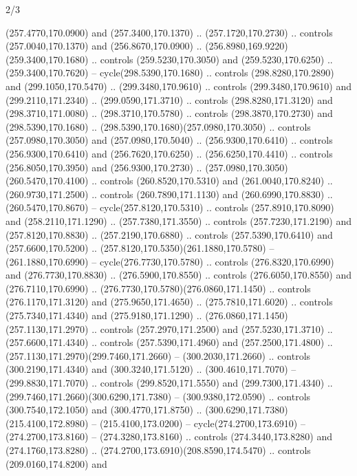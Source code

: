 \begin{flagdescription}{2/3}
\begin{scope}[xshift=0.5\flaglength,yshift=0.5\flagwidth,scale=\flagwidth/259.2]
\begin{scope}[y=0.8pt, x=0.8pt, yscale=-1,shift={(-243,-162)}]
      (257.4770,170.0900) and (257.3400,170.1370) .. (257.1720,170.2730) .. controls
      (257.0040,170.1370) and (256.8670,170.0900) ..
      (256.8980,169.9220)(259.3400,170.1680) .. controls (259.5230,170.3050) and
      (259.5230,170.6250) .. (259.3400,170.7620) -- cycle(298.5390,170.1680) ..
      controls (298.8280,170.2890) and (299.1050,170.5470) .. (299.3480,170.9610) ..
      controls (299.3480,170.9610) and (299.2110,171.2340) .. (299.0590,171.3710) ..
      controls (298.8280,171.3120) and (298.3710,171.0080) .. (298.3710,170.5780) ..
      controls (298.3870,170.2730) and (298.5390,170.1680) ..
      (298.5390,170.1680)(257.0980,170.3050) .. controls (257.0980,170.3050) and
      (257.0980,170.5040) .. (256.9300,170.6410) .. controls (256.9300,170.6410) and
      (256.7620,170.6250) .. (256.6250,170.4410) .. controls (256.8050,170.3950) and
      (256.9300,170.2730) .. (257.0980,170.3050)(260.5470,170.4100) .. controls
      (260.8520,170.5310) and (261.0040,170.8240) .. (260.9730,171.2500) .. controls
      (260.7890,171.1130) and (260.6990,170.8830) .. (260.5470,170.8670) --
      cycle(257.8120,170.5310) .. controls (257.8910,170.8090) and
      (258.2110,171.1290) .. (257.7380,171.3550) .. controls (257.7230,171.2190) and
      (257.8120,170.8830) .. (257.2190,170.6880) .. controls (257.5390,170.6410) and
      (257.6600,170.5200) .. (257.8120,170.5350)(261.1880,170.5780) --
      (261.1880,170.6990) -- cycle(276.7730,170.5780) .. controls
      (276.8320,170.6990) and (276.7730,170.8830) .. (276.5900,170.8550) .. controls
      (276.6050,170.8550) and (276.7110,170.6990) ..
      (276.7730,170.5780)(276.0860,171.1450) .. controls (276.1170,171.3120) and
      (275.9650,171.4650) .. (275.7810,171.6020) .. controls (275.7340,171.4340) and
      (275.9180,171.1290) .. (276.0860,171.1450)(257.1130,171.2970) .. controls
      (257.2970,171.2500) and (257.5230,171.3710) .. (257.6600,171.4340) .. controls
      (257.5390,171.4960) and (257.2500,171.4800) ..
      (257.1130,171.2970)(299.7460,171.2660) -- (300.2030,171.2660) .. controls
      (300.2190,171.4340) and (300.3240,171.5120) .. (300.4610,171.7070) --
      (299.8830,171.7070) .. controls (299.8520,171.5550) and (299.7300,171.4340) ..
      (299.7460,171.2660)(300.6290,171.7380) -- (300.9380,172.0590) .. controls
      (300.7540,172.1050) and (300.4770,171.8750) ..
      (300.6290,171.7380)(215.4100,172.8980) -- (215.4100,173.0200) --
      cycle(274.2700,173.6910) -- (274.2700,173.8160) -- (274.3280,173.8160) ..
      controls (274.3440,173.8280) and (274.1760,173.8280) ..
      (274.2700,173.6910)(208.8590,174.5470) .. controls (209.0160,174.8200) and

\end{scope}
\end{scope}
\end{flagdescription}
